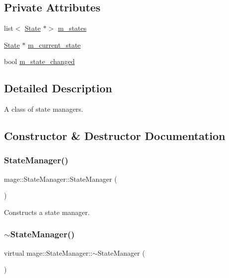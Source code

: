 \subsection*{Private Attributes}
\begin{DoxyCompactItemize}
\item 
list$<$ \hyperlink{classmage_1_1_state}{State} $\ast$$>$ \hyperlink{classmage_1_1_state_manager_a2181432805f365bfb8ccff0f959d2121}{m\+\_\+states}
\item 
\hyperlink{classmage_1_1_state}{State} $\ast$ \hyperlink{classmage_1_1_state_manager_a737122d580b709e0d122db4a6e1d9006}{m\+\_\+current\+\_\+state}
\item 
bool \hyperlink{classmage_1_1_state_manager_a8e905ec2358a18a5b56d44cf79799afa}{m\+\_\+state\+\_\+changed}
\end{DoxyCompactItemize}


\subsection{Detailed Description}
A class of state managers. 

\subsection{Constructor \& Destructor Documentation}
\hypertarget{classmage_1_1_state_manager_a6c4504d0b50fe671299b080f3be30c8e}{}\label{classmage_1_1_state_manager_a6c4504d0b50fe671299b080f3be30c8e} 
\subsubsection{\texorpdfstring{State\+Manager()}{StateManager()}}
{\footnotesize\ttfamily mage\+::\+State\+Manager\+::\+State\+Manager (\begin{DoxyParamCaption}{ }\end{DoxyParamCaption})}

Constructs a state manager. \hypertarget{classmage_1_1_state_manager_af4bc45cc90437f54e2776e2a8ee747e1}{}\label{classmage_1_1_state_manager_af4bc45cc90437f54e2776e2a8ee747e1} 
\subsubsection{\texorpdfstring{$\sim$\+State\+Manager()}{~StateManager()}}
{\footnotesize\ttfamily virtual mage\+::\+State\+Manager\+::$\sim$\+State\+Manager (\begin{DoxyParamCaption}{ }\end{DoxyParamCaption})\hspace{0.3cm}{\ttfamily [virtual]}}


